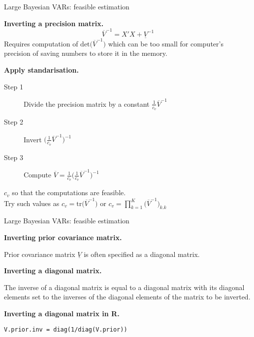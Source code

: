 \documentclass[notes,blackandwhite,mathsans,usenames,dvipsnames]{beamer}
\begin{document}
\begin{frame}{Large Bayesian VARs: feasible estimation}

\textbf{Inverting a precision matrix.}
$$ \overline{V}^{-1} = X'X + \underline{V}^{-1} $$
{\color{mcxs2}Requires computation of} $\text{det}\big(\overline{V}^{-1}\big)$ {\color{mcxs2}which can be too small for computer's precision of saving numbers to store it in the memory.}

\bigskip\textbf{Apply standarisation.}
\begin{description}
\item[Step 1] {\color{mcxs2}Divide the precision matrix by a constant} $\frac{1}{c_v}\overline{V}^{-1}$ 
\item[Step 2] {\color{mcxs2}Invert} $\big(\frac{1}{c_v}\overline{V}^{-1}\big)^{-1}$
\item[Step 3] {\color{mcxs2}Compute} $\overline{V} = \frac{1}{c_v}\big(\frac{1}{c_v}\overline{V}^{-1}\big)^{-1}$
\end{description}

 $c_v$ {\color{mcxs2}so that the computations are feasible.\\ Try such values as} $c_v=\text{tr}\big(\overline{V}^{-1}\big)$ {\color{mcxs2}or} $c_v=\prod_{k=1}^{K}\big(\overline{V}^{-1}\big)_{k.k}$
\end{frame}






\begin{frame}{Large Bayesian VARs: feasible estimation}

\textbf{Inverting prior covariance matrix.}

{\color{mcxs2} Prior covariance matrix} $\underline{V}$ {\color{mcxs2}is often specified as a diagonal matrix.} 

\bigskip\textbf{Inverting a diagonal matrix.}

{\color{mcxs2}The inverse of a diagonal matrix is equal to a diagonal matrix with its diagonal elements set to the inverses of the diagonal elements of the matrix to be inverted.}

\bigskip\textbf{Inverting a diagonal matrix in R.}

\texttt{V.prior.inv = diag(1/diag(V.prior))}
\end{frame}
\end{document}
